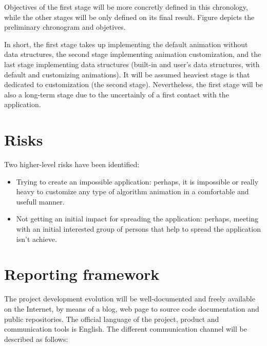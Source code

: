 \documentclass[twocolumn]{article}
\begin{document}
Objectives of the first stage will be more concretly defined in this
chronology, while the other stages will be only defined on its final
result. Figure  depicts the preliminary chronogram and
objetives.

In short, the first stage takes up implementing the default animation
without data structures, the second stage implementing animation
customization, and the last stage implementing data structures
(built-in and user's data structures, with default and
customizing animations). It will be assumed heaviest stage is that
dedicated to customization (the second stage). Nevertheless, the first
stage will be also a long-term stage due to the uncertainly of a first
contact with the application.

\section{Risks}
Two higher-level risks have been identified:

\begin{itemize}
  \item Trying to create an impossible application: perhaps, it is
    impossible or really heavy to customize any type of algorithm
    animation in a comfortable and usefull manner.
  \item Not getting an initial impact for spreading the application:
    perhaps, meeting with an initial interested group of persons that
    help to spread the application isn't achieve.
\end{itemize}

\section{Reporting framework}
The project development evolution will be well-documented and freely
available on the Internet, by means of a blog, web page to source code
documentation and public repositories. The official language of the
project, product and communication tools is English. The different
communication channel will be described as follows:
\end{document}
